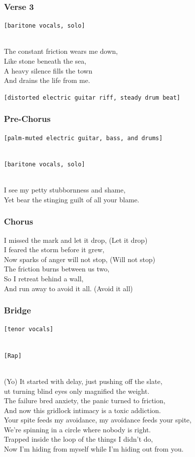 \subsubsection{Verse 3}\label{verse-3-5}

\texttt{{[}baritone\ vocals,\ solo{]}}\strut \\
The constant friction wears me down,\\
Like stone beneath the sea,\\
A heavy silence fills the town\\
And drains the life from me.

\texttt{{[}distorted\ electric\ guitar\ riff,\ steady\ drum\ beat{]}}

\subsubsection{Pre-Chorus}\label{pre-chorus-12}

\texttt{{[}palm-muted\ electric\ guitar,\ bass,\ and\ drums{]}}\strut \\
\texttt{{[}baritone\ vocals,\ solo{]}}\strut \\
I see my petty stubbornness and shame,\\
Yet bear the stinging guilt of all your blame.

\subsubsection{Chorus}\label{chorus-27}

I missed the mark and let it drop, (Let it drop)\\
I feared the storm before it grew,\\
Now sparks of anger will not stop, (Will not stop)\\
The friction burns between us two,\\
So I retreat behind a wall,\\
And run away to avoid it all. (Avoid it all)

\subsubsection{Bridge}\label{bridge-9}

\texttt{{[}tenor\ vocals{]}}\strut \\
\texttt{{[}Rap{]}}\strut \\
(Yo) It started with delay, just pushing off the slate,\\
ut turning blind eyes only magnified the weight.\\
The failure bred anxiety, the panic turned to friction,\\
And now this gridlock intimacy is a toxic addiction.\\
Your spite feeds my avoidance, my avoidance feeds your spite,\\
We're spinning in a circle where nobody is right.\\
Trapped inside the loop of the things I didn't do,\\
Now I'm hiding from myself while I'm hiding out from you.

